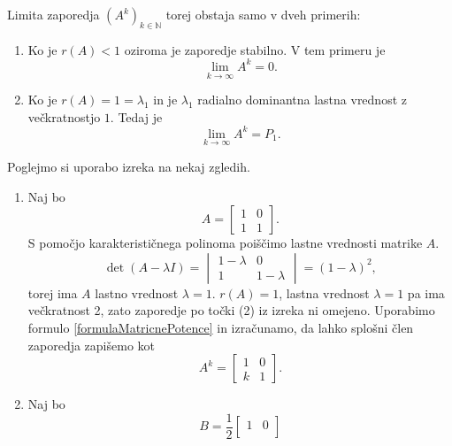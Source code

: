 \documentclass[mat1]{fmfdelo}
\newcommand{\N}{\mathbb N}
\begin{document}
Limita zaporedja $(A^k)_{k\in\N}$ torej obstaja samo v dveh primerih:
\begin{enumerate}
    \item Ko je $r(A) < 1$ oziroma je zaporedje stabilno. V tem primeru je \[\lim_{k\rightarrow\infty} A^k = 0.\]
    \item Ko je $r(A) = 1 = \lambda_1$ in je $\lambda_1$ radialno dominantna lastna vrednost z večkratnostjo $1$. Tedaj je \[\lim_{k\rightarrow\infty} A^k = P_1.\]
\end{enumerate}
Poglejmo si uporabo izreka na nekaj zgledih.
\begin{zgled}\label{zgledAsimptotika}
    \leavevmode
    \begin{enumerate}
        \item Naj bo
        \begin{equation*}
            A =
            \begin{bmatrix}
                1 & 0 \\
                1 & 1
            \end{bmatrix}.
        \end{equation*}
        S pomočjo karakterističnega polinoma poiščimo lastne vrednosti matrike $A$.
        \begin{equation*}
            \det (A - \lambda I) =
            \begin{vmatrix}
                1-\lambda & 0 \\
                1 & 1-\lambda
            \end{vmatrix}
            = (1-\lambda)^2,
        \end{equation*}
        torej ima $A$ lastno vrednost $\lambda=1$. $r(A) = 1$, lastna vrednost $\lambda = 1$ pa ima večkratnost 2, zato zaporedje po točki (2) iz izreka ni omejeno. Uporabimo formulo \eqref{formulaMatricnePotence} in izračunamo, da lahko splošni člen zaporedja zapišemo kot
        \begin{equation*}
            A^k =
            \begin{bmatrix}
                1 & 0 \\
                k & 1
            \end{bmatrix}.
        \end{equation*}
        \item Naj bo
        \begin{equation*}
            B = \frac{1}{2}
            \begin{bmatrix}
                1 & 0 \\

\end{bmatrix}
\end{equation*}
\end{enumerate}
\end{zgled}
\end{document}
